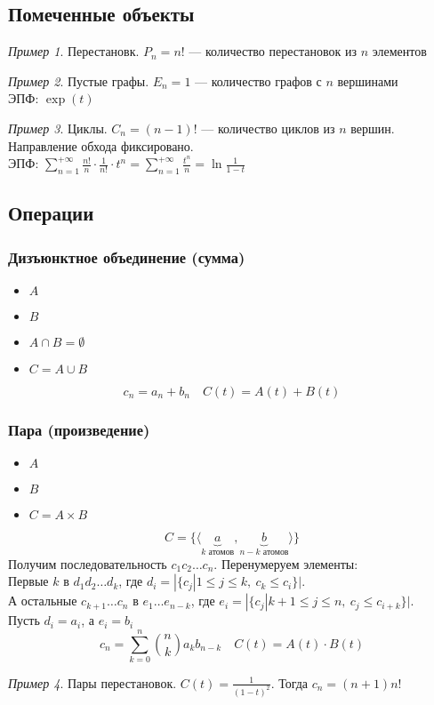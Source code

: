 \documentclass[english]{article}
\theoremstyle{plain}
\theoremstyle{remark}
\newtheorem*{examp}{Пример}
\theoremstyle{definition}
\begin{document}
\subsection{Помеченные объекты}
\label{sec:org57b1f70}
\begin{examp}
Перестановк. \(P_n = n!\) --- количество перестановок из \(n\) элементов
\end{examp}
\begin{examp}
Пустые графы. \(E_n = 1\) --- количество графов с \(n\) вершинами \\
ЭПФ: \(\exp(t)\)
\end{examp}
\begin{examp}
Циклы. \(C_n = (n - 1)!\) --- количество циклов из \(n\) вершин. Направление обхода фиксировано. \\
ЭПФ: \(\sum\limits_{n = 1}^{ + \infty} \frac{n!}{n}\cdot \frac{1}{n!}\cdot t^n = \sum\limits_{n = 1}^{ + \infty} \frac{t^n}{n} = \ln \frac{1}{1 - t}\)
\end{examp}
\subsection{Операции}
\label{sec:org11b51f0}
\subsubsection{Дизъюнктное объединение (сумма)}
\label{sec:org6dbabd1}
\begin{itemize}
\item \(A\)
\item \(B\)
\item \(A \cap B = \emptyset\)
\item \(C = A \cup B\)
\end{itemize}
\[ c_n = a_n + b_n\quad C(t) = A(t) + B(t) \]
\subsubsection{Пара (произведение)}
\label{sec:org8d97a25}
\begin{itemize}
\item \(A\)
\item \(B\)
\item \(C = A \times B\)
\end{itemize}
\[ C = \{\langle \underbrace{a}_{k\text{ атомов}}, \underbrace{b}_{n - k\text{ атомов}} \rangle\} \]
Получим последовательность \(c_1 c_2 \dots c_n\). Перенумеруем элементы: \\
Первые \(k\) в \(d_1d_2 \dots d_k\), где \(d_i = |\{c_j | 1 \le j \le k,\ c_k \le c_i\}|\). \\
А остальные \(c_{k + 1}\dots c_n\) в \(e_1 \dots e_{n - k}\), где \(e_i = |\{c_j | k + 1\le j \le n,\ c_j \le c_{i + k}\}|\). \\
Пусть \(d_i = a_i\), а \(e_i = b_i\)
\[ c_n = \sum_{k = 0}^{ n } \binom{n}{k} a_k b_{n - k} \quad C(t) = A(t) \cdot B(t)\]
\begin{examp}
Пары перестановок. \(C(t) = \frac{1}{(1 - t)^2}\). Тогда \(c_n = (n + 1)n!\)
\end{examp}
\end{document}

